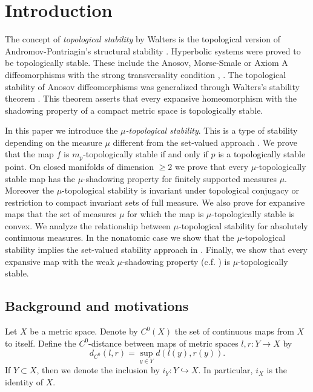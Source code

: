 \documentclass[11pt,letterpaper]{amsart}
\theoremstyle{plain}
\begin{document}
\maketitle




\section{Introduction}

\noindent
The concept of {\em topological stability} by Walters \cite{b,w} is the topological version of Andromov-Pontriagin's structural stability \cite{ap}. Hyperbolic systems were proved to be topologically stable.
These include the Anosov, Morse-Smale or Axiom A diffeomorphisms with the strong transversality condition \cite{n1}, \cite{w0}.
The topological stability of Anosov diffeomorphisms was generalized through Walters's stability theorem \cite{w}.
This theorem asserts that every expansive homeomorphism with the shadowing property of a compact metric space is topologically stable.

In this paper we introduce the {\em $\mu$-topological stability}. This is a type of stability depending on the measure $\mu$ different from the set-valued approach \cite{lm}.
We prove that the map $f$ is $m_p$-topologically stable
if and only if $p$ is a topologically stable point.
On closed manifolds of dimension $\geq2$ we prove that
every $\mu$-topologically stable map has the $\mu$-shadowing property for finitely supported measures $\mu$.
Moreover the $\mu$-topological stability is invariant under topological conjugacy or restriction to compact invariant sets of full measure.
We also prove for expansive maps that the set of measures $\mu$ for which the map is $\mu$-topologically stable is convex.
We analyze the relationship between $\mu$-topological stability for absolutely continuous measures.
In the nonatomic case we show that the $\mu$-topological stability implies the set-valued stability approach in \cite{lm}.
Finally, we show that every expansive map with the weak $\mu$-shadowing property (c.f. \cite{lr}) is $\mu$-topologically stable.


\subsection{Background and motivations}
Let $X$ be a metric space. Denote by $C^0(X)$ the set of continuous maps from $X$ to itself.
Define the $C^0$-distance between maps of metric spaces $l,r:Y\to X$ by
$$
d_{C^0}(l,r)=\sup_{y\in Y}d(l(y),r(y)).
$$
If $Y\subset X$, then we denote the inclusion by $i_Y: Y\hookrightarrow X$.
In particular, $i_X$ is the identity of $X$.
\end{document}
